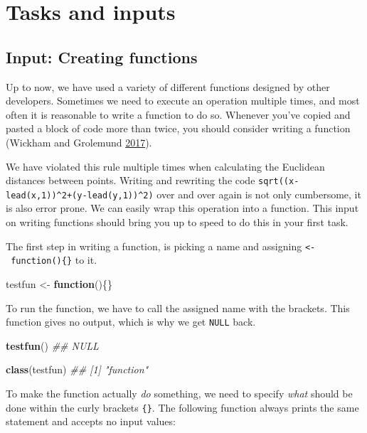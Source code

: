 \documentclass[]{book}
\newenvironment{Shaded}{\begin{snugshade}}{\end{snugshade}}
\newcommand{\CommentTok}[1]{\textcolor[rgb]{0.56,0.35,0.01}{\textit{#1}}}
\newcommand{\ControlFlowTok}[1]{\textcolor[rgb]{0.13,0.29,0.53}{\textbf{#1}}}
\newcommand{\KeywordTok}[1]{\textcolor[rgb]{0.13,0.29,0.53}{\textbf{#1}}}
\newcommand{\NormalTok}[1]{#1}
\newcommand{\StringTok}[1]{\textcolor[rgb]{0.31,0.60,0.02}{#1}}
\begin{document}
\hypertarget{tasks-and-inputs-3}{%
\section{Tasks and inputs}\label{tasks-and-inputs-3}}

\hypertarget{input-creating-functions}{%
\subsection{Input: Creating functions}\label{input-creating-functions}}

Up to now, we have used a variety of different functions designed by other developers. Sometimes we need to execute an operation multiple times, and most often it is reasonable to write a function to do so. Whenever you've copied and pasted a block of code more than twice, you should consider writing a function (Wickham and Grolemund \protect\hyperlink{ref-wickham2017}{2017}).

We have violated this rule multiple times when calculating the Euclidean distances between points. Writing and rewriting the code \texttt{sqrt((x-lead(x,1))\^{}2+(y-lead(y,1))\^{}2)} over and over again is not only cumbersome, it is also error prone. We can easily wrap this operation into a function. This input on writing functions should bring you up to speed to do this in your first task.

The first step in writing a function, is picking a name and assigning \texttt{\textless{}-\ function()\{\}} to it.

\begin{Shaded}
\begin{Highlighting}[]
\NormalTok{testfun <-}\StringTok{ }\ControlFlowTok{function}\NormalTok{()\{\}}
\end{Highlighting}
\end{Shaded}

To run the function, we have to call the assigned name with the brackets. This function gives no output, which is why we get \texttt{NULL} back.

\begin{Shaded}
\begin{Highlighting}[]
\KeywordTok{testfun}\NormalTok{()}
\CommentTok{## NULL}

\KeywordTok{class}\NormalTok{(testfun)}
\CommentTok{## [1] "function"}
\end{Highlighting}
\end{Shaded}

To make the function actually \emph{do} something, we need to specify \emph{what} should be done within the curly brackets \texttt{\{\}}. The following function always prints the same statement and accepts no input values:
\end{document}
